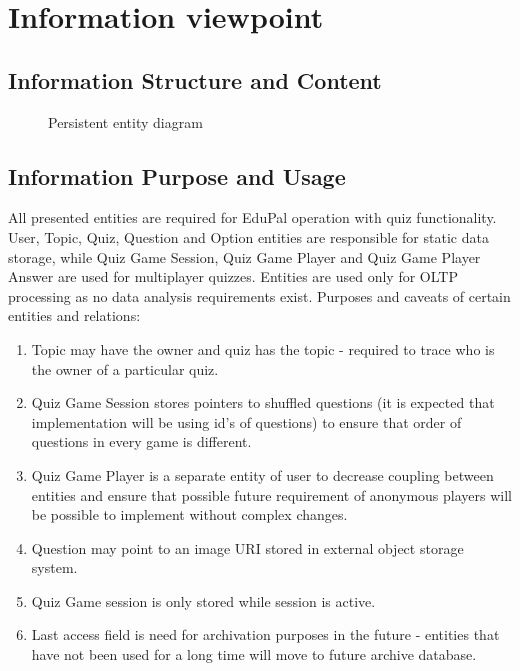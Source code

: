 \section{Information viewpoint}

\subsection{Information Structure and Content}

\begin{figure}[H]
  \caption{Persistent entity diagram}
  \label{fig:viewpoint-information-entity}
\end{figure}

\subsection{Information Purpose and Usage}

All presented entities are required for EduPal operation with quiz functionality. User, Topic, Quiz, Question and Option entities are responsible for static data storage, while Quiz Game Session, Quiz Game Player and Quiz Game Player Answer are used for multiplayer quizzes. Entities are used only for OLTP processing as no data analysis requirements exist. Purposes and caveats of certain entities and relations:

\begin{enumerate}
  \item Topic may have the owner and quiz has the topic - required to trace who is the owner of a particular quiz.
  \item Quiz Game Session stores pointers to shuffled questions (it is expected that implementation will be using id's of questions) to ensure that order of questions in every game is different.
  \item Quiz Game Player is a separate entity of user to decrease coupling between entities and ensure that possible future requirement of anonymous players will be possible to implement without complex changes.
  \item Question may point to an image URI stored in external object storage system.
  \item Quiz Game session is only stored while session is active.
  \item Last access field is need for archivation purposes in the future - entities that have not been used for a long time will move to future archive database.
\end{enumerate}

